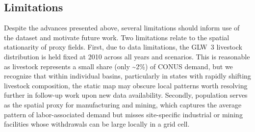 \documentclass[fleqn,10pt]{wlscirep}
\begin{document}



\subsection*{Limitations}

Despite the advances presented above, several limitations should inform use of the dataset and motivate future work. Two limitations relate to the spatial stationarity of proxy fields. First, due to data limitations, the GLW~3 livestock distribution is held fixed at 2010 across all years and scenarios. This is reasonable as livestock represents a small share (only \textasciitilde2\%) of CONUS demand, but we recognize that within individual basins, particularly in states with rapidly shifting livestock composition, the static map may obscure local patterns worth resolving further in follow-up work upon new data availability. Secondly, population serves as the spatial proxy for manufacturing and mining, which captures the average pattern of labor-associated demand but misses site-specific industrial or mining facilities whose withdrawals can be large locally in a grid cell.
\end{document}
